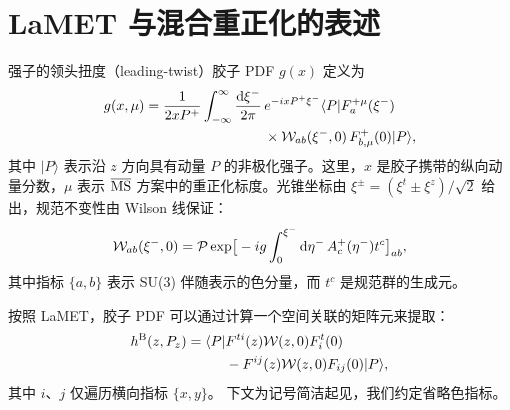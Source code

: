 \section{LaMET 与混合重正化的表述}
\label{sec:analytic}

强子的领头扭度（leading-twist）胶子 PDF $g(x)$ 定义为~\cite{Collins:1989gx}
%
\begin{align}\label{eq:LCPDF}
g(x,\mu) = \frac{1}{ 2 x P^+} \int_{-\infty}^\infty \frac{\mathrm{d} \xi^-}{2\pi} \,& e^{-i x P^+ \xi^-} \langle P | F_a^{+\mu}(\xi^-) \notag\\
&
 \times \mathcal{W}_{ab}(\xi^-, 0) \, F_{b,\mu}^+(0) | P \rangle,
\end{align}
其中 $|P\rangle$ 表示沿 $z$ 方向具有动量 $P$ 的非极化强子。这里，$x$ 是胶子携带的纵向动量分数，$\mu$ 表示 $\overline{\rm MS}$ 方案中的重正化标度。光锥坐标由 $\xi^\pm=(\xi^t\pm \xi^z)/\sqrt{2}$ 给出，规范不变性由 Wilson 线保证：
\begin{align}
\mathcal{W}_{ab}(\xi^-, 0)= \mathcal{P}\,{\rm exp}\big[ -i g \int_0^{\xi^-} \mathrm{d} \eta^- \, A_c^+(\eta^-) t^c \big]_{ab},
\end{align}
其中指标 $\{a,b\}$ 表示 SU(3) 伴随表示的色分量，而 $t^c$ 是规范群的生成元。

按照 LaMET，胶子 PDF 可以通过计算一个空间关联的矩阵元来提取：
\begin{align}
h^{\text{B}}(z,P_z)= \langle P | &F^{ti}(z)\mathcal{W}(z,0)F^t_{i}(0) \notag\\
&-F^{ij}(z)\mathcal{W}(z,0)F_{ij}(0)| P \rangle,
\end{align}
其中 $i$、$j$ 仅遍历横向指标 $\{x,y\}$。
下文为记号简洁起见，我们约定省略色指标。


